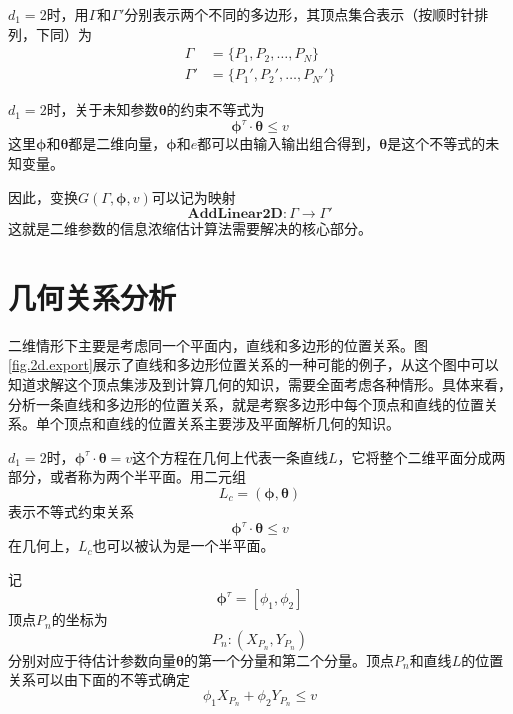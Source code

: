 $d_{1}=2$时，用$\Gamma$和$\Gamma'$分别表示两个不同的多边形，其顶点集合表示（按顺时针排列，下同）为
\begin{equation*}%
\begin{split}%
\Gamma&=\{P_{1},P_{2},\ldots,P_{N}\}\\
\Gamma'&=\{P_{1}',P_{2}',\ldots,P_{N'}'\}
\end{split}
\end{equation*}

$d_{1}=2$时，关于未知参数$\bm{\theta}$的约束不等式为
\begin{equation}\label{eq.3.L}
\bm{\phi}^{\tau}\cdot\bm{\theta}\leq v
\end{equation}
这里$\bm{\phi}$和$\bm{\theta}$都是二维向量，$\bm{\phi}$和$e$都可以由输入输出组合得到，$\bm{\theta}$是这个不等式的未知变量。

因此，变换$G(\Gamma,\bm{\phi},v)$可以记为映射
\begin{equation}%
\mathbf{AddLinear2D}\colon \Gamma\rightarrow\Gamma'
\end{equation}
这就是二维参数的信息浓缩估计算法需要解决的核心部分。

\section{几何关系分析}\label{sect:3.2}
二维情形下主要是考虑同一个平面内，直线和多边形的位置关系。图\ref{fig.2d.export}展示了直线和多边形位置关系的一种可能的例子，从这个图中可以知道求解这个顶点集涉及到计算几何的知识，需要全面考虑各种情形。具体来看，分析一条直线和多边形的位置关系，就是考察多边形中每个顶点和直线的位置关系。单个顶点和直线的位置关系主要涉及平面解析几何的知识。

$d_{1}=2$时，$\bm{\phi}^{\tau}\cdot\bm{\theta}=v$这个方程在几何上代表一条直线$L$，它将整个二维平面分成两部分，或者称为两个半平面。用二元组
$$L_{c}=(\bm{\phi},\bm{\theta})$$
表示不等式约束关系
\begin{equation}\label{eq.3.neq}
\bm{\phi}^{\tau}\cdot\bm{\theta}\leq v
\end{equation}
在几何上，$L_{c}$也可以被认为是一个半平面。

记
$$\bm{\phi}^{\tau}=[\phi_{1},\phi_{2}]$$
顶点$P_{n}$的坐标为
$$P_{n}\colon (X_{P_{n}},Y_{P_{n}})$$
分别对应于待估计参数向量$\bm{\theta}$的第一个分量和第二个分量。顶点$P_{n}$和直线$L$的位置关系可以由下面的不等式确定
\begin{equation}\label{eq.3.L.P}
\phi_{1}X_{P_{n}}+\phi_{2}Y_{P_{n}}\leq v
\end{equation}

